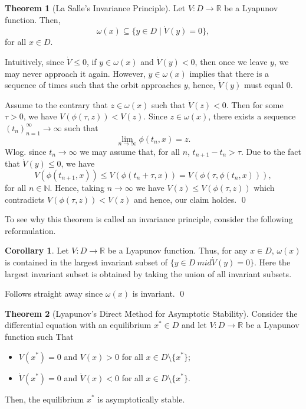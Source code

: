 \documentclass[
]{article}
\theoremstyle{definition}
\newtheorem{theorem}{Theorem}
\newtheorem{corollary}{Corollary}[theorem]
\theoremstyle{definition}
\begin{document}
\begin{theorem}[La Salle's Invariance Principle]
  Let \(V : D \to \mathbb{R}\) be a Lyapunov function. Then, 
  \[\omega(x) \subseteq \{y \in D \mid \dot V(y) = 0\},\]
  for all \(x \in D\).
\end{theorem}

Intuitively, since \(\dot V \le 0\), if \(y \in \omega(x)\) and
\(\dot V(y) < 0\), then once we leave \(y\), we may never approach it
again. However, \(y \in \omega(x)\) implies that there is a sequence of
times such that the orbit approaches \(y\), hence, \(\dot V(y)\) must
equal \(0\).

\proof

Assume to the contrary that \(z \in \omega(x)\) such that
\(\dot V(z) < 0\). Then for some \(\tau > 0\), we have
\(V(\phi(\tau, z)) < V(z)\). Since \(z \in \omega(x)\), there exists a
sequence \((t_n)_{n = 1}^\infty \to \infty\) such that
\[\lim_{n \to \infty} \phi(t_n, x) = z.\] Wlog. since \(t_n \to \infty\)
we may assume that, for all \(n\), \(t_{n + 1} - t_n > \tau\). Due to
the fact that \(\dot V(y) \le 0\), we have
\[V(\phi(t_{n + 1}, x)) \le V(\phi(t_n + \tau, x)) = V(\phi(\tau, \phi(t_n, x))),\]
for all \(n \in \mathbb{N}\). Hence, taking \(n \to \infty\) we have
\(V(z) \le V(\phi(\tau, z))\) which contradicts
\(V(\phi(\tau, z)) < V(z)\) and hence, our claim holdes. \qed

To see why this theorem is called an invariance principle, consider the
following reformulation.

\begin{corollary}
  Let \(V : D \to \mathbb{R}\) be a Lyapunov function. Thus, for any \(x \in D\), 
  \(\omega(x)\) is contained in the largest invariant subset of \(\{y \in D\ mid \dot V(y) = 0\}\). 
  Here the largest invariant subset is obtained by taking the union of all 
  invariant subsets.
\end{corollary}
\proof

Follows straight away since \(\omega(x)\) is invariant. \qed

\begin{theorem}[Lyapunov's Direct Method for Asymptotic Stability]
  Consider the differential equation with an equilibrium \(x^* \in D\) and 
  let \(V : D \to \mathbb{R}\) be a Lyapunov function such That 
  \begin{itemize}
    \item \(V(x^*) = 0\) and \(V(x) > 0\) for all \(x \in D \setminus \{x^*\}\);
    \item \(\dot V(x^*) = 0\) and \(\dot V(x) < 0\) for all \(x \in D \setminus \{x^*\}\).
  \end{itemize}
  Then, the equilibrium \(x^*\) is asymptotically stable.
\end{theorem}
\proof
\end{document}
